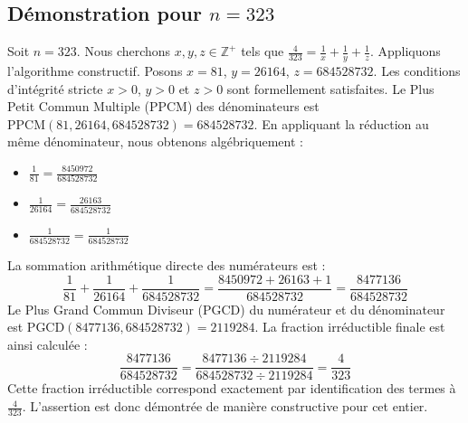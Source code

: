 \documentclass[11pt,a4paper]{article}
\begin{document}
\subsection{Démonstration pour $n = 323$}
Soit $n = 323$. Nous cherchons $x, y, z \in \mathbb{Z}^{+}$ tels que $\frac{4}{323} = \frac{1}{x} + \frac{1}{y} + \frac{1}{z}$.
Appliquons l'algorithme constructif. Posons $x = 81$, $y = 26164$, $z = 684528732$.
Les conditions d'intégrité stricte $x > 0$, $y > 0$ et $z > 0$ sont formellement satisfaites.
Le Plus Petit Commun Multiple (PPCM) des dénominateurs est $\text{PPCM}(81, 26164, 684528732) = 684528732$.
En appliquant la réduction au même dénominateur, nous obtenons algébriquement :
\begin{itemize}
    \item $\frac{1}{81} = \frac{8450972}{684528732}$
    \item $\frac{1}{26164} = \frac{26163}{684528732}$
    \item $\frac{1}{684528732} = \frac{1}{684528732}$
\end{itemize}
La sommation arithmétique directe des numérateurs est :
$$ \frac{1}{81} + \frac{1}{26164} + \frac{1}{684528732} = \frac{8450972 + 26163 + 1}{684528732} = \frac{8477136}{684528732} $$
Le Plus Grand Commun Diviseur (PGCD) du numérateur et du dénominateur est $\text{PGCD}(8477136, 684528732) = 2119284$.
La fraction irréductible finale est ainsi calculée :
$$ \frac{8477136}{684528732} = \frac{8477136 \div 2119284}{684528732 \div 2119284} = \frac{4}{323} $$
Cette fraction irréductible correspond exactement par identification des termes à $\frac{4}{323}$. L'assertion est donc démontrée de manière constructive pour cet entier.
\end{document}
